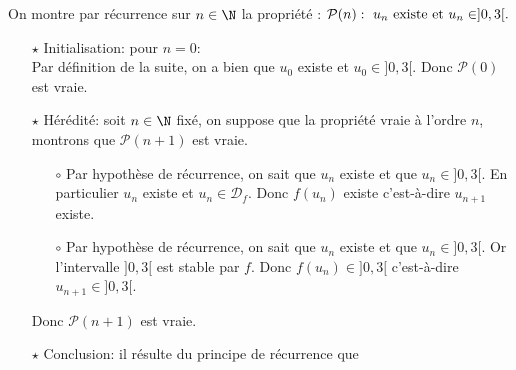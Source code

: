 \documentclass[a4paper, 11pt]{article}
\begin{document}
\begin{correction}
\begin{enumerate}
\begin{enumerate}
On montre par r\'ecurrence sur $n\in\N$ la propri\'et\'e : $\mathcal{P}(n):\ u_n\ \hbox{existe et}\ u_n\in\rbrack 0,3\lbrack.$
\begin{itemize}
\item[$\star$] Initialisation: pour $n=0$:\\
\noindent Par d\'efinition de la suite, on a bien que $u_0$ existe et $u_0\in\rbrack 0,3\lbrack$. Donc $\mathcal{P}(0)$ est vraie.
\item[$\star$] H\'er\'edit\'e: soit $n\in\N$ fix\'e, on suppose que la propri\'et\'e vraie \`{a} l'ordre $n$, montrons que $\mathcal{P}(n+1)$ est vraie.
\begin{itemize}
\item[$\circ$] Par hypoth\`{e}se de r\'ecurrence, on sait que $u_n$ existe et que $u_n\in\rbrack 0,3\lbrack$. En particulier $u_n$ existe et $u_n\in\mathcal{D}_f$. Donc $f(u_n)$ existe c'est-\`{a}-dire $u_{n+1}$ existe.
\item[$\circ$] Par hypoth\`{e}se de r\'ecurrence, on sait que $u_n$ existe et que $u_n\in\rbrack 0,3\lbrack$. Or l'intervalle $\rbrack 0,3\lbrack$ est stable par $f$. Donc $f(u_n)\in\rbrack 0,3\lbrack$ c'est-\`{a}-dire $u_{n+1}\in\rbrack 0,3\lbrack$.
\end{itemize}
Donc $\mathcal{P}(n+1)$ est vraie.
\item[$\star$] Conclusion: il r\'esulte du principe de r\'ecurrence que 



\end{itemize}
\end{enumerate}
\end{enumerate}
\end{correction}
\end{document}
